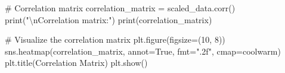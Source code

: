 \documentclass[
  11pt,
  letterpaper,
  DIV=11,
  numbers=noendperiod]{scrartcl}
\newenvironment{Shaded}{\begin{snugshade}}{\end{snugshade}}
\newcommand{\BuiltInTok}[1]{\textcolor[rgb]{0.00,0.23,0.31}{#1}}
\newcommand{\CharTok}[1]{\textcolor[rgb]{0.13,0.47,0.30}{#1}}
\newcommand{\CommentTok}[1]{\textcolor[rgb]{0.37,0.37,0.37}{#1}}
\newcommand{\DecValTok}[1]{\textcolor[rgb]{0.68,0.00,0.00}{#1}}
\newcommand{\NormalTok}[1]{\textcolor[rgb]{0.00,0.23,0.31}{#1}}
\newcommand{\OperatorTok}[1]{\textcolor[rgb]{0.37,0.37,0.37}{#1}}
\newcommand{\StringTok}[1]{\textcolor[rgb]{0.13,0.47,0.30}{#1}}
\newcommand{\VariableTok}[1]{\textcolor[rgb]{0.07,0.07,0.07}{#1}}
\begin{document}
\begin{Shaded}
\begin{Highlighting}[]
\CommentTok{\# Correlation matrix}
\NormalTok{correlation\_matrix }\OperatorTok{=}\NormalTok{ scaled\_data.corr()}
\BuiltInTok{print}\NormalTok{(}\StringTok{"}\CharTok{\textbackslash{}n}\StringTok{Correlation matrix:"}\NormalTok{)}
\BuiltInTok{print}\NormalTok{(correlation\_matrix)}

\CommentTok{\# Visualize the correlation matrix}
\NormalTok{plt.figure(figsize}\OperatorTok{=}\NormalTok{(}\DecValTok{10}\NormalTok{, }\DecValTok{8}\NormalTok{))}
\NormalTok{sns.heatmap(correlation\_matrix, annot}\OperatorTok{=}\VariableTok{True}\NormalTok{, fmt}\OperatorTok{=}\StringTok{".2f"}\NormalTok{, cmap}\OperatorTok{=}\StringTok{\textquotesingle{}coolwarm\textquotesingle{}}\NormalTok{)}
\NormalTok{plt.title(}\StringTok{\textquotesingle{}Correlation Matrix\textquotesingle{}}\NormalTok{)}
\NormalTok{plt.show()}
\end{Highlighting}
\end{Shaded}
\end{document}
